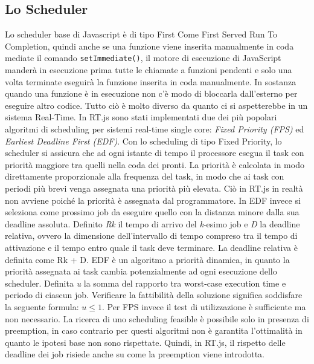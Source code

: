 \documentclass[conference]{IEEEtran}
\begin{document}
\subsection{Lo Scheduler}
Lo scheduler base di Javascript è di tipo First Come First Served Run To Completion, quindi anche se una funzione viene inserita manualmente in coda mediate il comando \texttt{setImmediate()}, il motore di esecuzione di JavaScript manderà in esecuzione prima tutte le chiamate a funzioni pendenti e solo una volta terminate eseguirà la funzione inserita in coda manualmente. In sostanza quando una funzione è in esecuzione non c’è modo di bloccarla dall'esterno per eseguire altro codice. Tutto ciò è molto diverso da quanto ci si aspetterebbe in un sistema Real-Time.
\newline
In RT.js sono stati implementati due dei più popolari algoritmi di scheduling per sistemi real-time single core: \textit{Fixed Priority (FPS)} ed \textit{Earliest Deadline First (EDF)}.
\newline
Con lo scheduling di tipo Fixed Priority, lo scheduler si assicura che ad ogni istante di tempo il processore esegua il task con priorità maggiore tra quelli nella coda dei pronti. La priorità è calcolata in modo direttamente proporzionale alla frequenza del task, in modo che ai task con periodi più brevi venga assegnata una priorità più elevata. Ciò in RT.js in realtà non avviene poiché la priorità è assegnata dal programmatore.
\newline
In EDF invece si seleziona come prossimo job da eseguire quello con la distanza minore dalla sua deadline assoluta. Definito \textit{Rk} il tempo di arrivo del \textit{k}-esimo job e \textit{D} la deadline relativa, ovvero la dimensione dell'intervallo di tempo compreso tra il tempo di attivazione e il tempo entro quale il task deve terminare. La deadline relativa è definita come Rk + D. EDF è un algoritmo a priorità dinamica, in quanto la priorità assegnata ai task cambia potenzialmente ad ogni esecuzione dello scheduler.
\newline
Definita \textit{u} la somma del rapporto tra worst-case execution time e periodo di ciascun job. Verificare la fattibilità della soluzione significa soddisfare la seguente formula: $u \leq 1$. Per FPS invece il test di utilizzazione è sufficiente ma non necessario. La ricerca di uno scheduling feasible è possibile solo in presenza di preemption, in caso contrario per questi algoritmi non è garantita l'ottimalità in quanto le ipotesi base non sono rispettate. Quindi, in RT.js, il rispetto delle deadline dei job risiede anche su come la preemption viene introdotta.
\end{document}
